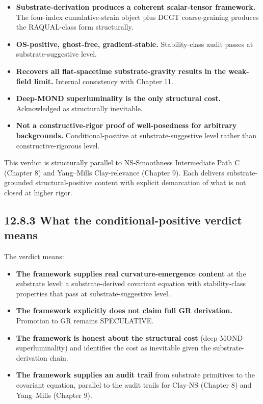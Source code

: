 \documentclass[11pt]{book}
\begin{document}
\begin{itemize}
\item \textbf{Substrate-derivation produces a coherent scalar-tensor framework.} The four-index cumulative-strain object plus DCGT coarse-graining produces the RAQUAL-class form structurally.
\item \textbf{OS-positive, ghost-free, gradient-stable.} Stability-class audit passes at substrate-suggestive level.
\item \textbf{Recovers all flat-spacetime substrate-gravity results in the weak-field limit.} Internal consistency with Chapter 11.
\item \textbf{Deep-MOND superluminality is the only structural cost.} Acknowledged as structurally inevitable.
\item \textbf{Not a constructive-rigor proof of well-posedness for arbitrary backgrounds.} Conditional-positive at substrate-suggestive level rather than constructive-rigorous level.
\end{itemize}

This verdict is structurally parallel to NS-Smoothness Intermediate Path C (Chapter 8) and Yang–Mills Clay-relevance (Chapter 9). Each delivers substrate-grounded structural-positive content with explicit demarcation of what is not closed at higher rigor.

\subsection{12.8.3 What the conditional-positive verdict means}

The verdict means:
\begin{itemize}
\item \textbf{The framework supplies real curvature-emergence content} at the substrate level: a substrate-derived covariant equation with stability-class properties that pass at substrate-suggestive level.
\item \textbf{The framework explicitly does not claim full GR derivation.} Promotion to GR remains SPECULATIVE.
\item \textbf{The framework is honest about the structural cost} (deep-MOND superluminality) and identifies the cost as inevitable given the substrate-derivation chain.
\item \textbf{The framework supplies an audit trail} from substrate primitives to the covariant equation, parallel to the audit trails for Clay-NS (Chapter 8) and Yang–Mills (Chapter 9).
\end{itemize}
\end{document}

